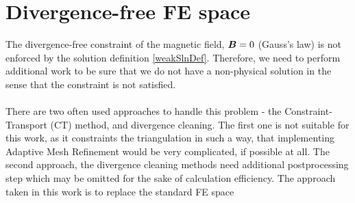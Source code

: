 \section{Divergence-free FE space}
The divergence-free constraint of the magnetic field, $\mbox{\boldmath $B$} = 0$ (Gauss's law) is not enforced by the solution definition \ref{weakSlnDef}. Therefore, we need to perform additional work to be sure that we do not have a non-physical solution in the sense that the constraint is not satisfied.
\paragraph{}
There are two often used approaches to handle this problem - the Constraint-Transport (CT) method, and divergence cleaning. The first one is not suitable for this work, as it constraints the triangulation in such a way, that implementing Adaptive Mesh Refinement would be very complicated, if possible at all. The second approach, the divergence cleaning methods need additional postprocessing step which may be omitted for the sake of calculation efficiency. The approach taken in this work is to replace the standard FE space 
